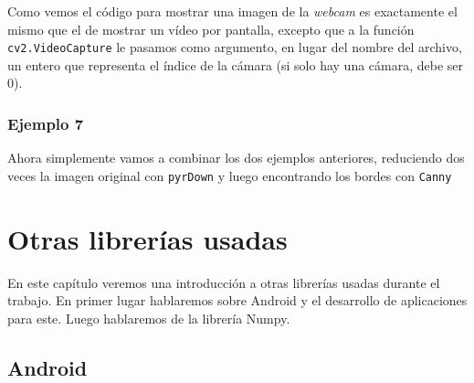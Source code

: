 \documentclass[a4paper,openright, 12pt]{book}
\begin{document}
\newpage

Como vemos el código para mostrar una imagen de la \textit{webcam} es exactamente el mismo que el de mostrar un vídeo por pantalla, excepto que a la función \lstinline|cv2.VideoCapture| le pasamos como argumento, en lugar del nombre del archivo, un entero que representa el índice de la cámara (si solo hay una cámara, debe ser 0).
\newpage

\newpage 
\subsection*{Ejemplo 7}
Ahora simplemente vamos a combinar los dos ejemplos anteriores, reduciendo dos veces la imagen original con \lstinline|pyrDown| y luego encontrando los bordes con \lstinline|Canny|

\newpage

\chapter{Otras librerías usadas} \label{cap.otras}
En este capítulo veremos una introducción a otras librerías usadas durante el trabajo. En primer lugar hablaremos sobre Android y el desarrollo de aplicaciones para este. Luego hablaremos de la librería Numpy.
\section{Android}
\end{document}
